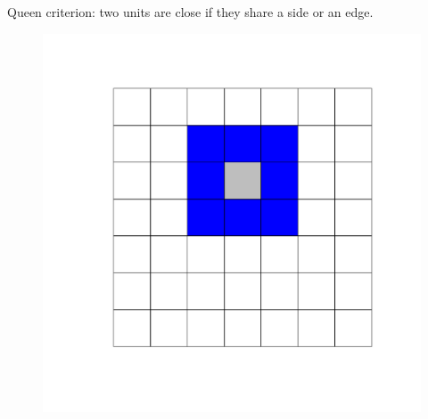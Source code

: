 \documentclass[
  shownotes,
  xcolor={svgnames},
  hyperref={colorlinks,citecolor=DarkBlue,linkcolor=DarkRed,urlcolor=DarkBlue}
   , aspectratio=169]{beamer}
\begin{document}
\begin{frame}[fragile]
\begin{minipage}[t]{0.45\linewidth}
    \end{minipage}
    \hfill
\begin{minipage}[t]{0.45\linewidth}%
Queen criterion: two units are close if they share a side or an edge.
  \begin{figure}[H] \centering
    \captionsetup{justification=centering}
    \includegraphics[scale=0.3]{figures/queen.pdf}
   \end{figure}
\end{minipage}


\end{frame}

\end{document}
